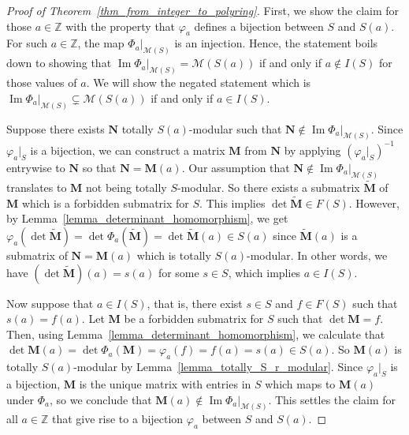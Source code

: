\documentclass[a4paper, 11pt]{article}
\DeclareMathOperator{\Ima}{Im}
\newcommand{\Z}{\mathbb{Z}}
\newcommand{\bM}{\bm{M}}
\newcommand{\bN}{\bm{N}}
\newcommand{\intvar}{a}
\newcommand{\polyS}{S}
\newcommand{\polyM}{\bM}
\begin{document}
	\begin{proof}[Proof of Theorem~\ref{thm_from_integer_to_polyring}]
		First, we show the claim for those $\intvar\in\Z$ with the property that $\varphi_{\intvar}$ defines a bijection between $\polyS$ and $S(\intvar)$. For such $\intvar\in\Z$, the map $\Phi_{\intvar}|_{\mathcal{M}(S)}$ is an injection. Hence, the statement boils down to showing that $\Ima\Phi_{\intvar}|_{\mathcal{M}(S)} = \mathcal{M}(S(\intvar))$ if and only if $\intvar \notin I(\polyS)$ for those values of $\intvar$. We will show the negated statement which is $\Ima\Phi_{\intvar}|_{\mathcal{M}(S)} \subsetneq \mathcal{M}(S(\intvar))$ if and only if $\intvar \in I(\polyS)$.
		
		Suppose there exists $\bN$ totally $S(\intvar)$-modular such that $\bN\notin \Ima\Phi_{\intvar}|_{\mathcal{M}(\polyS)}$. Since $\varphi_{\intvar}|_S$ is a bijection, we can construct a matrix $\polyM$ from $\bN$ by applying $(\varphi_{\intvar}|_S)^{-1}$ entrywise to $\bN$ so that $\bN = \bM(\intvar)$. Our assumption that $\bN\notin \Ima\Phi_{\intvar}|_{\mathcal{M}(\polyS)}$ translates to $\polyM$ not being totally $\polyS$-modular. So there exists a submatrix $\tilde{\polyM}$ of $\polyM$ which is a forbidden submatrix for $\polyS$. This implies $\det\tilde{\polyM}\in F(\polyS)$. However, by Lemma~\ref{lemma_determinant_homomorphism}, we get $\varphi_\intvar(\det\tilde{\polyM}) = \det\Phi_{\intvar}(\tilde{\polyM}) = \det\tilde{\bM}(\intvar)\in S(\intvar)$ since $\tilde{\bM}(\intvar)$ is a submatrix of $\bN = \bM(\intvar)$ which is totally $S(\intvar)$-modular. In other words, we have $(\det\tilde{\polyM})(\intvar) = s(\intvar)$ for some $s\in\polyS$, which implies $\intvar\in I(\polyS)$.
		
		Now suppose that $\intvar\in I(\polyS)$, that is, there exist $s\in \polyS$ and $f\in F(\polyS)$ such that $s(\intvar) = f(\intvar)$. Let $\polyM$ be a forbidden submatrix for $\polyS$ such that $\det\polyM = f$. Then, using Lemma~\ref{lemma_determinant_homomorphism}, we calculate that $\det\bM(\intvar) = \det\Phi_{\intvar}(\polyM) = \varphi_{\intvar}(f) = f(\intvar) = s(\intvar) \in S(\intvar)$. So $\bM(\intvar)$ is totally $S(\intvar)$-modular by Lemma~\ref{lemma_totally_S_r_modular}. Since $\varphi_{\intvar}|_S$ is a bijection, $\bM$ is the unique matrix with entries in $\polyS$ which maps to $\bM(\intvar)$ under $\Phi_{\intvar}$, so we conclude that $\bM(\intvar)\notin \Ima\Phi_{\intvar}|_{\mathcal{M}(\polyS)}$. This settles the claim for all $\intvar\in\Z$ that give rise to a bijection $\varphi_{\intvar}$ between $\polyS$ and $S(\intvar)$.
		

\end{proof}
\end{document}
